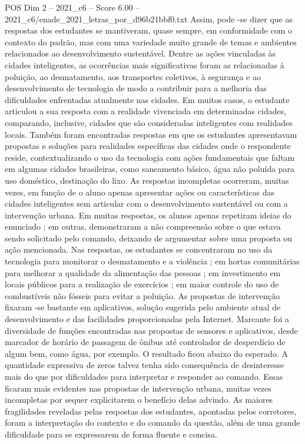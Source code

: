 \begin{textsample}{POS Dim 2 – 2021\_c6 – Score 6.00 – 2021\_c6/enade\_2021\_letras\_por\_d96b21bbf0.txt}
Assim, pode -se dizer que as respostas dos estudantes se mantiveram, quase sempre, em conformidade com o contexto do padrão, mas com uma variedade muito grande de temas e ambientes relacionados ao desenvolvimento sustentável.
Dentre as ações vinculadas às cidades inteligentes, as ocorrências mais significativas foram as relacionadas à poluição, ao desmatamento, aos transportes coletivos, à segurança e ao desenvolvimento de tecnologia de modo a contribuir para a melhoria das dificuldades enfrentadas atualmente nas cidades.
Em muitos casos, o estudante articulou a sua resposta com a realidade vivenciada em determinadas cidades, comparando, inclusive, cidades que são consideradas inteligentes com realidades locais.
Também foram encontradas respostas em que os estudantes apresentavam propostas e soluções para realidades específicas das cidades onde o respondente reside, contextualizando o uso da tecnologia com ações fundamentais que faltam em algumas cidades brasileiras, como saneamento básico, água não poluída para uso doméstico, destinação do lixo.
As respostas incompletas ocorreram, muitas vezes, em função de o aluno apenas apresentar ações ou características das cidades inteligentes sem articular com o desenvolvimento sustentável ou com a intervenção urbana.
Em muitas respostas, os alunos apenas repetiram ideias do enunciado ; em outras, demonstraram a não compreensão sobre o que estava sendo solicitado pelo comando, deixando de argumentar sobre uma proposta ou ação mencionada.
Nas respostas, os estudantes se concentraram no uso da tecnologia para monitorar o desmatamento e a violência ; em hortas comunitárias para melhorar a qualidade da alimentação das pessoas ; em investimento em locais públicos para a realização de exercícios ; em maior controle do uso de combustíveis não fósseis para evitar a poluição.
As propostas de intervenção fixaram -se bastante em aplicativos, solução sugerida pelo ambiente atual de desenvolvimento e das facilidades proporcionadas pela Internet.
Marcante foi a diversidade de funções encontradas nas propostas de sensores e aplicativos, desde marcador de horário de passagem de ônibus até controlador de desperdício de algum bem, como água, por exemplo.
O resultado ficou abaixo do esperado.
A quantidade expressiva de zeros talvez tenha sido consequência de desinteresse mais do que por dificuldades para interpretar e responder ao comando.
Essas ficaram mais evidentes nas propostas de intervenção urbana, muitas vezes incompletas por sequer explicitarem o benefício delas advindo.
As maiores fragilidades reveladas pelas respostas dos estudantes, apontadas pelos corretores, foram a interpretação do contexto e do comando da questão, além de uma grande dificuldade para se expressarem de forma fluente e concisa.

\end{textsample}
